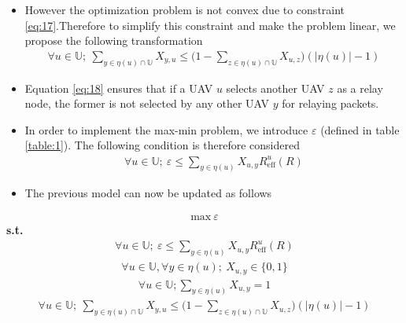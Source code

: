 \documentclass{beamer}
\begin{document}
\begin{frame}{}
\begin{itemize}
    \item However the optimization problem is not convex due to constraint \eqref{eq:17}.Therefore to simplify this constraint and make the problem linear, we propose the following transformation
    \begin{align}
    \forall{u} \in \mathbb{U};\ \sum_{y \in \eta(u) \cap \mathbb{U}}X_{y,u} \leq \Bigg(1- \sum_{z \in \eta(u) \cap \mathbb{U}}X_{u,z}\Bigg)(\vert{\eta(u)}\vert - 1)\label{eq:18}
    \end{align}
    \item Equation \eqref{eq:18} ensures that if a UAV $u$ selects another UAV $z$ as a relay node, the former is not selected by any other UAV $y$ for relaying packets.
    \item In order to implement the max-min problem, we introduce $\varepsilon$ (defined in table \ref{table:1}). The following condition is therefore considered
    \begin{align}
       \forall{u} \in \mathbb{U};\ \varepsilon \leq  \sum_{y \in \eta(u)} X_{u,y}R^{u}_{\text{eff}}(R)\label{eq:19}
    \end{align}
\end{itemize}    
\end{frame}

\begin{frame}{}
\begin{itemize}
    \item The previous model can now be updated as follows
\end{itemize}
\begin{align}
\text{max}\ \varepsilon
\end{align}
\qquad  \textbf{s.t.}
\begin{align}
       \forall{u} \in \mathbb{U};\ \varepsilon \leq  \sum_{y \in \eta(u)} X_{u,y}R^{u}_{\text{eff}}(R)\label{eq:21}
\end{align}
\begin{align}
 \forall{u} \in \mathbb{U},\forall{y} \in \eta(u);\ X_{u,y} \in \{0,1\}\label{eq:22}
\end{align}
\begin{align}
   \forall{u} \in \mathbb{U};\sum_{y\in \eta(u)}X_{u,y} = 1\label{eq:23}
\end{align}
\begin{align}
    \forall{u} \in \mathbb{U};\ \sum_{y \in \eta(u) \cap \mathbb{U}}X_{y,u} \leq \Bigg(1- \sum_{z \in \eta(u) \cap \mathbb{U}}X_{u,z}\Bigg)(\vert{\eta(u)}\vert - 1)\label{eq:24}
\end{align}
\end{frame}
\end{document}
